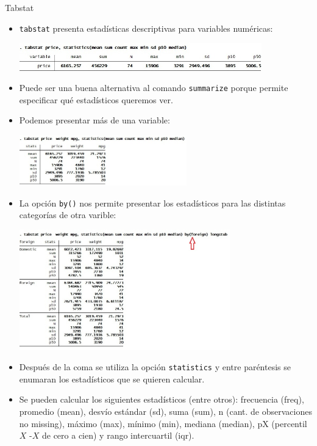 \documentclass{beamer}
\begin{document}
\begin{frame}[allowframebreaks]{Tabstat}
\begin{itemize}
\item \texttt{tabstat} presenta estadísticas descriptivas para variables numéricas:\\
\medskip
\centerline{\includegraphics[height=1.2cm]{tabstat.jpg}}
\item Puede ser una buena alternativa al comando \texttt{summarize} porque permite especificar qué estadísticos queremos ver.
\item Podemos presentar más de una variable:\\
\medskip
\centerline{\includegraphics[height=2.2cm]{tabstat1.jpg}}
\item La opción \texttt{by()} nos permite presentar los estadísticos para las distintas categorías de otra varible:
\centerline{\includegraphics[height=5.2cm]{tabstat3.jpg}}
\item Después de la coma se utiliza la opción \texttt{statistics} y entre paréntesis se enumaran los estadísticos que se quieren calcular.
\item Se pueden calcular los siguientes estadísticos (entre otros): frecuencia (freq), promedio (mean), desvío estándar (sd), suma (sum), n (cant. de observaciones no missing), máximo (max), mínimo (min), mediana (median), pX (percentil $X$ -$X$ de cero a cien) y rango intercuartil (iqr). 
\end{itemize}
\end{frame}
\end{document}
